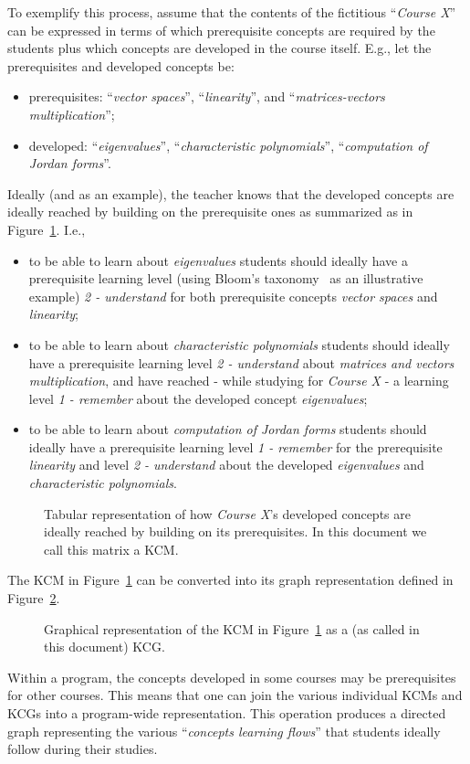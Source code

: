 \begin{example}
	To exemplify this process, assume that the contents of the fictitious ``\emph{Course X}'' can be expressed in terms of which prerequisite concepts are required by the students plus which concepts are developed in the course itself. E.g., let the prerequisites and developed concepts be:
	\begin{itemize}
		\item prerequisites: ``\emph{vector spaces}'', ``\emph{linearity}'', and ``\emph{matrices-vectors multiplication}'';
		\item developed: ``\emph{eigenvalues}'', ``\emph{characteristic polynomials}'', ``\emph{computation of Jordan forms}''.
	\end{itemize}
	Ideally (and as an example), the teacher knows that the developed concepts are ideally reached by building on the prerequisite ones as summarized as in Figure~\ref{fig:KCM}. I.e.,
	\begin{itemize}
		\item to be able to learn about \emph{eigenvalues} students should ideally have a prerequisite learning level (using Bloom's taxonomy~\cite{bloom1956taxonomy} as an illustrative example) \emph{2 - understand} for both prerequisite concepts \emph{vector spaces} and \emph{linearity};
		\item to be able to learn about \emph{characteristic polynomials} students should ideally have a prerequisite learning level \emph{2 - understand} about \emph{matrices and vectors multiplication}, and have reached - while studying for \emph{Course X} - a learning level \emph{1 - remember} about the developed concept \emph{eigenvalues};
		\item to be able to learn about \emph{computation of Jordan forms} students should ideally have a prerequisite learning level \emph{1 - remember} for the prerequisite \emph{linearity} and level \emph{2 - understand} about the developed \emph{eigenvalues} and \emph{characteristic polynomials}.
	\end{itemize}
	\begin{figure}[!htbp]
		\centering
		
		\caption{Tabular representation of how \emph{Course X}'s developed concepts are ideally reached by building on its prerequisites. In this document we call this matrix a \acf{KCM}.}
		\label{fig:KCM}
	\end{figure}
	The \ac{KCM} in Figure~\ref{fig:KCM} can be converted into its graph representation defined in Figure~\ref{fig:KCG}.
	\begin{figure}[!htbp]
		\centering
		
		\caption{Graphical representation of the \acf{KCM} in Figure~\ref{fig:KCM} as a (as called in this document) \acf{KCG}.}
		\label{fig:KCG}
	\end{figure}
	Within a program, the concepts developed in some courses may be prerequisites for other courses. This means that one can join the various individual \acp{KCM} and \acp{KCG} into a program-wide representation. This operation produces a directed graph representing the various ``\emph{concepts learning flows}'' that students ideally follow during their studies. 
\label{exa:KCM}
\end{example}

